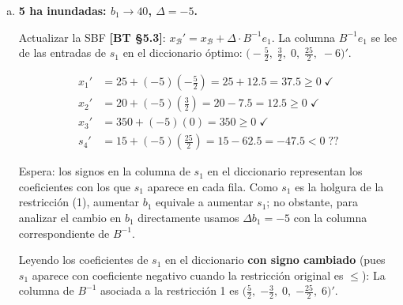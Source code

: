 \documentclass{article}
\begin{document}
\begin{enumerate}[a)]
Los nuevos costos reducidos de las no básicas son:
\begin{align*}
\bar{c}_{s_1}' &= 0 - 130\left(\tfrac{5}{2}\right) - 200\left(-\tfrac{3}{2}\right) + 10\cdot 0 = -325+300 = -25 \leq 0 \\
\bar{c}_{s_2}' &= 0 - 130\left(-\tfrac{1}{4}\right) - 200\left(\tfrac{1}{4}\right) + 0 = 32.5 - 50 = -17.5 \leq 0 \\
\bar{c}_{s_3}' &= 0 - 130\left(-\tfrac{1}{4}\right) - 200\left(\tfrac{1}{4}\right) + 10 = 32.5 - 50 + 10 = -7.5 \leq 0
\end{align*}

Todos los costos reducidos son $\leq 0$: la base sigue siendo óptima \textbf{[BT §5.1]}.

Nuevo $Z' = 130(25) + 200(20) - 10(350) = 3250 + 4000 - 3500 = \mathbf{3750}$ M\$. La utilidad baja en 500 M\$.

\item \textbf{5 ha inundadas: $b_1 \to 40$, $\Delta = -5$.}

Actualizar la SBF \textbf{[BT §5.3]}: $x_{\mathcal{B}}' = x_{\mathcal{B}} + \Delta \cdot B^{-1}e_1$. La columna $B^{-1}e_1$ se lee de las entradas de $s_1$ en el diccionario óptimo: $\bigl(-\tfrac{5}{2},\;\tfrac{3}{2},\;0,\;\tfrac{25}{2},\;-6\bigr)'$.

\begin{align*}
x_1' &= 25 + (-5)\left(-\tfrac{5}{2}\right) = 25 + 12.5 = 37.5 \geq 0 \;\checkmark\\
x_2' &= 20 + (-5)\left(\tfrac{3}{2}\right) = 20 - 7.5 = 12.5 \geq 0 \;\checkmark\\
x_3' &= 350 + (-5)(0) = 350 \geq 0 \;\checkmark\\
s_4' &= 15 + (-5)\left(\tfrac{25}{2}\right) = 15 - 62.5 = -47.5 < 0 \;\text{??}
\end{align*}

Espera: los signos en la columna de $s_1$ en el diccionario representan los coeficientes con los que $s_1$ aparece en cada fila. Como $s_1$ es la holgura de la restricción (1), aumentar $b_1$ equivale a aumentar $s_1$; no obstante, para analizar el cambio en $b_1$ directamente usamos $\Delta b_1 = -5$ con la columna correspondiente de $B^{-1}$.

Leyendo los coeficientes de $s_1$ en el diccionario \textbf{con signo cambiado} (pues $s_1$ aparece con coeficiente negativo cuando la restricción original es $\leq$):
La columna de $B^{-1}$ asociada a la restricción 1 es $\bigl(\tfrac{5}{2},\;{-\tfrac{3}{2}},\;0,\;{-\tfrac{25}{2}},\;6\bigr)'$.


\end{enumerate}
\end{document}
